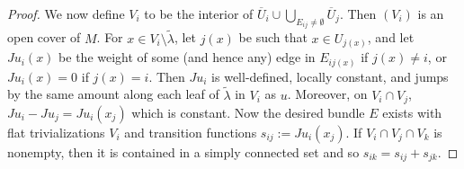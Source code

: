 \documentclass[reqno,10pt]{amsart}
\theoremstyle{definition}
\numberwithin{equation}{section}
\begin{document}
\begin{proof}
We now define $V_i$ to be the interior of $\overline U_i \cup \bigcup_{E_{ij} \neq \emptyset} \overline U_j$.
Then $(V_i)$ is an open cover of $M$.
For $x \in V_i \setminus \tilde \lambda$, let $j(x)$ be such that $x \in U_{j(x)}$, and let $Ju_i(x)$ be the weight of some (and hence any) edge in $E_{ij(x)}$ if $j(x) \neq i$, or $Ju_i(x) = 0$ if $j(x) = i$.
Then $Ju_i$ is well-defined, locally constant, and jumps by the same amount along each leaf of $\tilde \lambda$ in $V_i$ as $u$.
Moreover, on $V_i \cap V_j$, $Ju_i - Ju_j = Ju_i(x_j)$ which is constant.
Now the desired bundle $E$ exists with flat trivializations $V_i$ and transition functions $s_{ij} := Ju_i(x_j)$.
If $V_i \cap V_j \cap V_k$ is nonempty, then it is contained in a simply connected set and so $s_{ik} = s_{ij} + s_{jk}$.
\end{proof}
\end{document}
